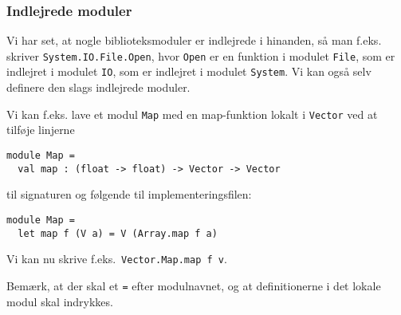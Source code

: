 \documentclass{beamer}
\begin{document}
\begin{frame}[fragile=singleslide]
\frametitle{Indlejrede moduler}

Vi har set, at nogle biblioteksmoduler er indlejrede i hinanden, så
man f.eks. skriver \texttt{System.IO.File.Open}, hvor \texttt{Open} er
en funktion i modulet \texttt{File}, som er indlejret i modulet
\texttt{IO}, som er indlejret i modulet \texttt{System}.
Vi kan også selv definere den slags indlejrede moduler.

Vi kan f.eks. lave et modul \texttt{Map} med en map-funktion lokalt i
\texttt{Vector} ved at tilføje linjerne

\renewcommand{\baselinestretch}{0.82}
{\small
\begin{verbatim}
module Map =
  val map : (float -> float) -> Vector -> Vector
\end{verbatim}
}
\renewcommand{\baselinestretch}{1.0}

til signaturen og følgende til implementeringsfilen:


\renewcommand{\baselinestretch}{0.82}
{\small
\begin{verbatim}
module Map =
  let map f (V a) = V (Array.map f a)
\end{verbatim}
}
\renewcommand{\baselinestretch}{1.0}

Vi kan nu skrive f.eks.\ \texttt{Vector.Map.map f v}.

Bemærk, at der skal et \texttt{=} efter modulnavnet,
og at definitionerne i det lokale modul skal indrykkes.


\end{frame}
\end{document}
